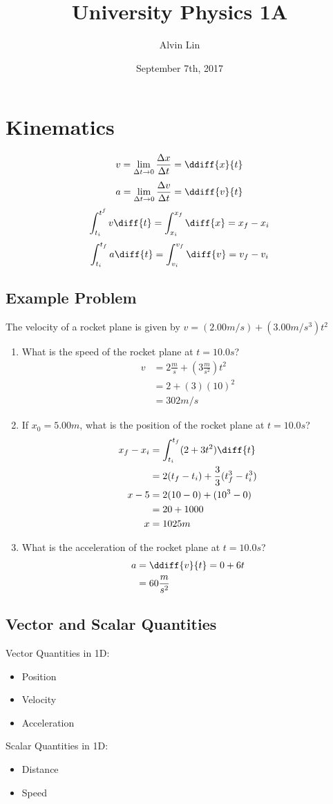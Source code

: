 \documentclass[letterpaper, 12pt]{math}
\title{University Physics 1A}
\author{Alvin Lin}
\date{September 7th, 2017}
\begin{document}
\maketitle

\section*{Kinematics}
\[ v = \lim_{\Delta t\to0}\frac{\Delta x}{\Delta t} = \ddiff{x}{t} \]
\[ a = \lim_{\Delta t\to0}\frac{\Delta v}{\Delta t} = \ddiff{v}{t} \]
\[ \int_{t_i}^{t^f}v\diff{t} = \int_{x_i}^{x_f}\diff{x} = x_f-x_i \]
\[ \int_{t_i}^{t_f}a\diff{t} = \int_{v_i}^{v_f}\diff{v} = v_f-v_i \]

\subsection*{Example Problem}
The velocity of a rocket plane is given by \( v = (2.00 m/s) + (3.00m/s^3)t^2 \)
\begin{enumerate}
  \item What is the speed of the rocket plane at \( t = 10.0s \)?
    \begin{align*}
      v &= 2\frac{m}{s}+(3\frac{m}{s^2})t^2 \\
      &= 2+(3)(10)^2 \\
      &= 302m/s
    \end{align*}
  \item If \( x_0 = 5.00m \), what is the position of the rocket plane at
    \( t = 10.0s \)?
    \begin{align*}
      x_f-x_i &= \int_{t_i}^{t_f}(2+3t^2)\diff{t} \\
      &= 2(t_f-t_i)+\frac{3}{3}(t_f^3-t_i^3) \\
      x-5 &= 2(10-0)+(10^3-0) \\
      &= 20+1000 \\
      x &= 1025m
    \end{align*}
  \item What is the acceleration of the rocket plane at \( t = 10.0s \)?
    \begin{align*}
      a &= \ddiff{v}{t} = 0+6t \\
      &= 60\frac{m}{s^2}
    \end{align*}
\end{enumerate}

\subsection*{Vector and Scalar Quantities}
Vector Quantities in 1D:
\begin{itemize}
  \item Position
  \item Velocity
  \item Acceleration
\end{itemize}
Scalar Quantities in 1D:
\begin{itemize}
  \item Distance
  \item Speed
\end{itemize}
\end{document}
